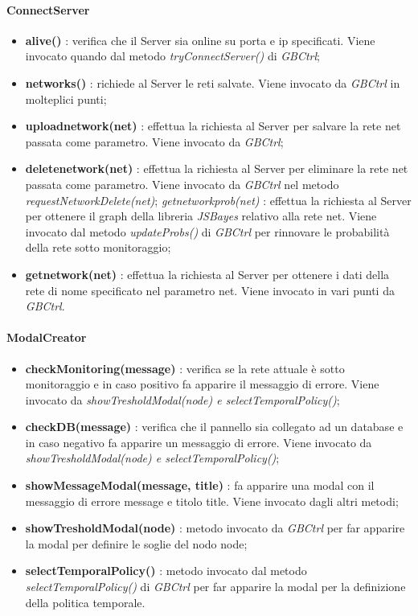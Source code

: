 				  \paragraph{ConnectServer}
			\begin{itemize}
				\item \textbf{alive()} : verifica che il Server sia online su porta e ip specificati. Viene invocato quando dal metodo \textit{tryConnectServer()} di \textit{GBCtrl};
				\item \textbf{networks()} : richiede al Server le reti salvate. Viene invocato da \textit{GBCtrl} in molteplici punti;
				\item \textbf{uploadnetwork(net)} : effettua la richiesta al Server per salvare la rete net passata come parametro. Viene invocato da \textit{GBCtrl};
				\item \textbf{deletenetwork(net)} : effettua la richiesta al Server per eliminare la rete net passata come parametro. Viene invocato da \textit{GBCtrl} nel metodo \textit{requestNetworkDelete(net)};
				\textit{getnetworkprob(net)} : effettua la richiesta al Server per ottenere il graph della libreria \textit{JSBayes} relativo alla rete net. Viene invocato dal metodo \textit{updateProbs()} di \textit{GBCtrl} per rinnovare le probabilità della rete sotto monitoraggio;
				\item \textbf{getnetwork(net)} : effettua la richiesta al Server per ottenere i dati della rete di nome specificato nel parametro net. Viene invocato in vari punti da \textit{GBCtrl}.
			\end{itemize}
				  \paragraph{ModalCreator}
			\begin{itemize}
				\item \textbf{checkMonitoring(message)} : verifica se la rete attuale è sotto monitoraggio e in caso positivo fa apparire il messaggio di errore. Viene invocato da \textit{showTresholdModal(node) e selectTemporalPolicy()};
				\item \textbf{checkDB(message)} : verifica che il pannello sia collegato ad un database e in caso negativo fa apparire un messaggio di errore. Viene invocato da \textit{showTresholdModal(node) e selectTemporalPolicy()};
				\item \textbf{showMessageModal(message, title)} : fa apparire una modal con il messaggio di errore message e titolo title. Viene invocato dagli altri metodi;
				\item \textbf{showTresholdModal(node)} : metodo invocato da \textit{GBCtrl} per far apparire la modal per definire le soglie del nodo node;
				\item \textbf{selectTemporalPolicy()} : metodo invocato dal metodo \textit{selectTemporalPolicy()} di \textit{GBCtrl} per far apparire la modal per la definizione della politica temporale.
			\end{itemize}

